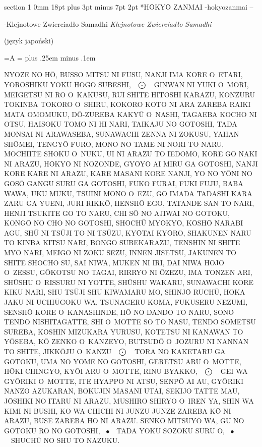 \documentclass[12pt]{article}
\makeatletter
\renewcommand{\section}{\@startsection%
 {section}			%
 {1}				%
 {0mm}				%
 {18pt plus 3pt minus 7pt}	%
 { 2pt}				%
 {\bfseries}}			%
\newcommand{\keisu}		{\mbox{\ $\bigodot$\ \ }}
\newcommand{\shokei}		{\mbox{\ $\bullet$\ \ }}
\newcounter{labelnum}
\newenvironment{Prayer}[4]{%
	\section*{#2}
	\ifx -#1
		\stepcounter{labelnum}\label{label.\arabic{labelnum}}\nopagebreak
	\else
		\label{#1}\nopagebreak
	\fi
	\ifx -#3
		\addcontentsline{toc}{section}{#2}
	\else
		\addcontentsline{toc}{section}{#3}
	\fi
	\ifx -#4
		{}
	\else
		\noindent\emph{#4}\par\nopagebreak
	\fi
	\begingroup
}
{\par\endgroup}
\newcommand{\wersaliki}{%
	\newbox\Abox
	\newdimen\Aspacja
	\setbox\Abox=\hbox{A}
	\Aspacja=\wd\Abox
	\spaceskip \Aspacja plus .25em minus .1em
}
\newenvironment{JAPANESE}
{
	\parindent	0pt
	\parfillskip	0pt
	\language 255
	\begingroup
	\wersaliki
	\par
}
{\par\endgroup}
\makeatother
\begin{document}
\begin{Prayer}{hokyozanmai}
	{H\=OKY\=O ZANMAI}{-}
	{Klejnotowe Zwierciadło Samadhi}

\begin{center}
	\scriptsize
	(język japoński)
\end{center}


\begin{JAPANESE}
NYOZE NO H\=O, BUSSO MITSU NI FUSU, NANJI IMA KORE O~ETARI, YOROSHIKU YOKU
H\=OGO SUBESHI, \keisu GINWAN NI YUKI O~MORI, MEIGETSU NI RO O~KAKUSU, RUI
SHITE HITOSHI KARAZU, KONZURU TOKINBA TOKORO O~SHIRU, KOKORO KOTO NI ARA
ZAREBA RAIKI MATA OMOMUKU, D\=O-ZUREBA KAKY\=U O~NASHI, TAGAEBA KOCHO NI
OTSU, HAISOKU TOMO NI HI NARI, TAIKAJU NO GOTOSHI, TADA MONSAI NI
ARAWASEBA, SUNAWACHI ZENNA NI ZOKUSU, YAHAN SH\=OMEI, TENGY\=O FURO, MONO
NO TAME NI NORI TO NARU, MOCHIITE SHOKU O~NUKU, UI NI ARAZU TO IEDOMO, KORE
GO NAKI NI ARAZU, H\=OKY\=O NI NOZONDE, GY\=OY\=O AI MIRU GA GOTOSHI, NANJI
KORE KARE NI ARAZU, KARE MASANI KORE NANJI, YO NO Y\=ONI NO GOS\=O GANGU
SURU GA GOTOSHI, FUKO FURAI, FUKI FUJU, BABA WAWA, UKU MUKU, TSUINI MONO
O~EZU, GO IMADA TADASHI KARA ZARU GA YUENI, J\=URI RIKK\=O, HENSH\=O EGO,
TATANDE SAN TO NARI, HENJI TSUKITE GO TO NARU, CHI S\=O NO AJIWAI NO
GOTOKU, KONG\=O NO CHO NO GOTOSHI, SH\=OCH\=U MY\=OKY\=O, K\=OSH\=O NARABI
AGU, SH\=U NI TS\=UJI TO NI TS\=UZU, KY\=OTAI KY\=ORO, SHAKUNEN
NARU TO KINBA KITSU NARI, BONGO SUBEKARAZU, TENSHIN NI SHITE MY\=O NARI,
MEIGO NI ZOKU SEZU, INNEN JISETSU, JAKUNEN TO SHITE SH\=OCHO SU, SAI NIWA,
MUKEN NI IRI, DAI NIWA H\=OJO O~ZESSU, G\=OKOTSU NO TAGAI, RIRRYO
NI \=OZEZU, IMA TONZEN ARI, SH\=USHU O~RISSURU NI YOTTE, SH\=USHU
WAKARU, SUNAWACHI KORE KIKU NARI, SHU TS\=UJI SHU KIWAMARU MO, SHINJ\=O
RUCH\=U, HOKA JAKU NI UCHI\=UGOKU WA, TSUNAGERU KOMA, FUKUSERU NEZUMI,
SENSH\=O KORE O~KANASHINDE, H\=O NO DANDO TO NARU, SONO TEND\=O
NISHITAGATTE, SHI O~MOTTE SO TO NASU, TEND\=O S\=OMETSU SUREBA, K\=OSHIN
MIZUKARA YURUSU, KOTETSU NI KANAWAN TO Y\=OSEBA, K\=O ZENKO O~KANZEYO,
BUTSUD\=O O~JOZURU NI NANNAN TO SHITE, JIKK\=OJU O~KANZU \keisu TORA NO
KAKETARU GA GOTOKU, UMA NO YOME NO GOTOSHI, GERETSU ARU O~MOTTE, H\=OKI
CHINGYO, KY\=OI ARU O~MOTTE, RINU BYAKKO, \keisu GEI WA GY\=ORIKI O~MOTTE,
ITE HYAPPO NI ATSU, SENP\=O AI AU, GY\=ORIKI NANZO AZUKARAN, BOKUJIN MASANI
UTAI, SEKIJO TATTE MAU, J\=OSHIKI NO ITARU NI ARAZU, MUSHIRO SHIRYO O~IREN
YA, SHIN WA KIMI NI BUSHI, KO WA CHICHI NI JUNZU JUNZE ZAREBA K\=O NI
ARAZU, BUSE ZAREBA HO NI ARAZU. SENK\=O MITSUY\=O WA, GU NO GOTOKU RO NO
GOTOSHI, \shokei TADA YOKU S\=OZOKU SURU O, \shokei SHUCH\=U NO SHU TO
NAZUKU.
\end{JAPANESE}
\end{Prayer}
\end{document}
